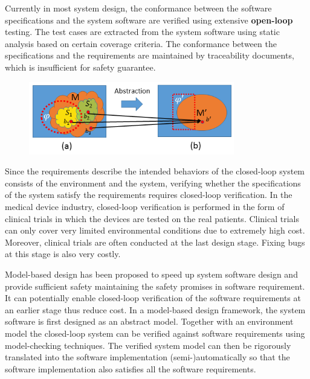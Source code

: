 \documentclass{llncs}
\begin{document}
Currently in most system design, the conformance between the software specifications and the system software are verified using extensive \textbf{open-loop} testing. The test cases are extracted from the system software using static analysis based on certain coverage criteria. The conformance between the specifications and the requirements are maintained by traceability documents, which is insufficient for safety guarantee.
\begin{figure}[!t]
		\centering
		\includegraphics[width=0.8\textwidth]{figs/distinction.png}
		\caption{\small }
		\label{fig:distinction}
\end{figure}

Since the requirements describe the intended behaviors of the closed-loop system consists of the environment and the system, verifying whether the specifications of the system satisfy the requirements requires closed-loop verification. In the medical device industry,    closed-loop verification is performed in the form of clinical trials in which the devices are tested on the real patients. Clinical trials can only cover very limited environmental conditions due to extremely high cost. Moreover, clinical trials are often conducted at the last design stage. Fixing bugs at this stage is also very costly.

Model-based design has been proposed to speed up system software design and provide sufficient safety maintaining the safety promises in software requirement. It can potentially enable closed-loop verification of the software requirements at an earlier stage thus reduce cost. In a model-based design framework, the system software is first designed as an abstract model. Together with an environment model the closed-loop system can be verified against software requirements using model-checking techniques. The verified system model can then be rigorously translated into the software implementation (semi-)automatically so that the software implementation also satisfies all the software requirements.
\end{document}
